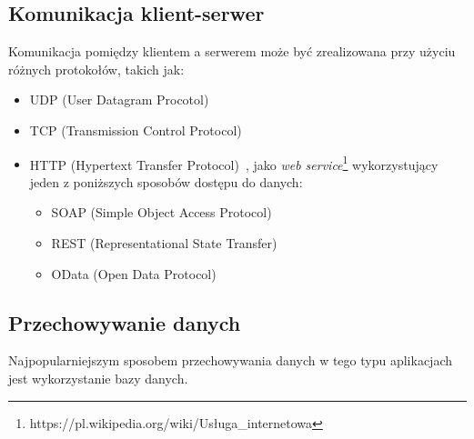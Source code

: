 \subsection{Komunikacja klient-serwer}
Komunikacja pomiędzy klientem a serwerem może być zrealizowana przy użyciu różnych protokołów, takich jak:
\begin{itemize}
 \item UDP (User Datagram Procotol)~\cite{udp}
 \item TCP (Transmission Control Protocol)~\cite{tcp}
 \item HTTP (Hypertext Transfer Protocol)~\cite{http1,http2}, jako \emph{web service}\footnote{https://pl.wikipedia.org/wiki/Usługa\_internetowa} wykorzystujący jeden z poniższych sposobów dostępu do danych:
  \begin{itemize}
   \item SOAP (Simple Object Access Protocol)~\cite{soap}
   \item REST (Representational State Transfer)~\cite{rest}
   \item OData (Open Data Protocol)~\cite{odata}
  \end{itemize}
\end{itemize}


\subsection{Przechowywanie danych}
Najpopularniejszym sposobem przechowywania danych w tego typu aplikacjach jest wykorzystanie bazy danych.
